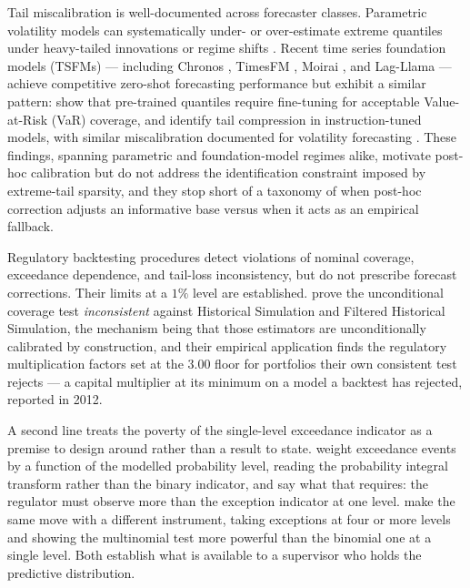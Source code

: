 \documentclass[preprint,11pt,authoryear]{elsarticle}
\newcommand{\1}{\boldsymbol{1}}
\begin{document}
Tail miscalibration is well-documented across forecaster classes. Parametric volatility models can systematically under- or over-estimate extreme quantiles under heavy-tailed innovations or regime shifts \citep{christoffersen1998,mcneil2000estimation,nolde2017elicitability}. Recent time series foundation models (TSFMs) --- including Chronos \citep{ansari2024chronos,ansari2025chronos2}, TimesFM \citep{das2024timesfm}, Moirai \citep{woo2024moirai,liu2025moirai}, and Lag-Llama \citep{rasul2024lagllama} --- achieve competitive zero-shot forecasting performance but exhibit a similar pattern: \citet{goel2024tsfmvar} show that pre-trained quantiles require fine-tuning for acceptable Value-at-Risk (VaR) coverage, and \citet{pele2025llmvar} identify tail compression in instruction-tuned models, with similar miscalibration documented for volatility forecasting \citep{goel2025volatility,rahimikia2025revisiting}. These findings, spanning parametric and foundation-model regimes alike, motivate post-hoc calibration but do not address the identification constraint imposed by extreme-tail sparsity, and they stop short of a taxonomy of when post-hoc correction adjusts an informative base versus when it acts as an empirical fallback.

Regulatory backtesting procedures \citep{kupiec1995,christoffersen1998,basel1996,acerbi2014back,fissler2016higher,nolde2017elicitability} detect violations of nominal coverage, exceedance dependence, and tail-loss inconsistency, but do not prescribe forecast corrections. Their limits at a $1\%$ level are established. \citet{escanciano2012pitfalls} prove the unconditional coverage test \emph{inconsistent} against Historical Simulation and Filtered Historical Simulation, the mechanism being that those estimators are unconditionally calibrated by construction, and their empirical application finds the regulatory multiplication factors set at the $3.00$ floor for portfolios their own consistent test rejects --- a capital multiplier at its minimum on a model a backtest has rejected, reported in 2012.

A second line treats the poverty of the single-level exceedance indicator as a premise to design around rather than a result to state. \citet{gordy2020spectral} weight exceedance events by a function of the modelled probability level, reading the probability integral transform rather than the binary indicator, and say what that requires: the regulator must observe more than the exception indicator at one level. \citet{kratz2018multinomial} make the same move with a different instrument, taking exceptions at four or more levels and showing the multinomial test more powerful than the binomial one at a single level. Both establish what is available to a supervisor who holds the predictive distribution.
\end{document}
